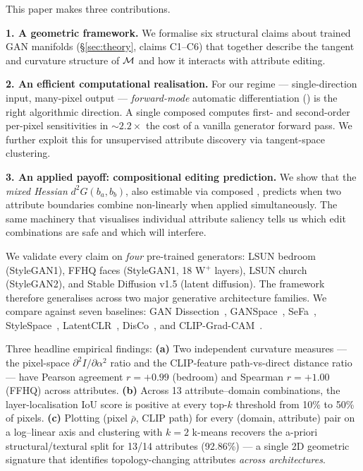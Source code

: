 This paper makes three contributions.

\textbf{1. A geometric framework.} We formalise six structural claims
about trained GAN manifolds (\S\ref{sec:theory}, claims C1--C6) that
together describe the tangent and curvature structure of $\mathcal{M}$ and how
it interacts with attribute editing.

\textbf{2. An efficient computational realisation.} For our regime —
single-direction input, many-pixel output — \emph{forward-mode}
automatic differentiation (\jvp) is the right algorithmic direction.
A single composed \jvp computes first- and second-order per-pixel
sensitivities in $\sim 2.2 \times$ the cost of a vanilla generator
forward pass. We further exploit this for unsupervised attribute
discovery via tangent-space clustering.

\textbf{3. An applied payoff: compositional editing prediction.} We
show that the \emph{mixed Hessian} $d^2 G(b_a, b_b)$, also estimable
via composed \jvp, predicts when two attribute boundaries combine
non-linearly when applied simultaneously. The same machinery that
visualises individual attribute saliency tells us which edit
combinations are safe and which will interfere.

We validate every claim on \emph{four} pre-trained generators:
LSUN bedroom (StyleGAN1), FFHQ faces (StyleGAN1, 18 W$^+$ layers),
LSUN church (StyleGAN2), and Stable Diffusion v1.5 (latent
diffusion). The framework therefore generalises across two major
generative architecture families. We compare against seven baselines:
GAN Dissection~\cite{Bau2019GANDissection},
GANSpace~\cite{Harkonen2020GANSpace},
SeFa~\cite{Shen2021SeFa},
StyleSpace~\cite{Wu2021StyleSpace},
LatentCLR~\cite{Yuksel2021LatentCLR},
DisCo~\cite{Ren2022DisCo}, and
CLIP-Grad-CAM~\cite{Selvaraju2017GradCAM}.

Three headline empirical findings:
\textbf{(a)} Two independent curvature measures --- the pixel-space
$\partial^2 I/\partial\alpha^2$ ratio and the CLIP-feature
path-vs-direct distance ratio --- have Pearson agreement
$r = +0.99$ (bedroom) and Spearman $r = +1.00$ (FFHQ) across
attributes.
\textbf{(b)} Across 13 attribute--domain combinations, the
layer-localisation IoU score is positive at every top-$k$
threshold from 10\% to 50\% of pixels.
\textbf{(c)} Plotting (pixel $\bar\rho$, CLIP path) for every
(domain, attribute) pair on a log--linear axis and clustering with
$k=2$ k-means recovers the a-priori structural/textural split for
13/14 attributes (92.86\%) --- a single 2D geometric signature that
identifies topology-changing attributes \emph{across architectures}.

